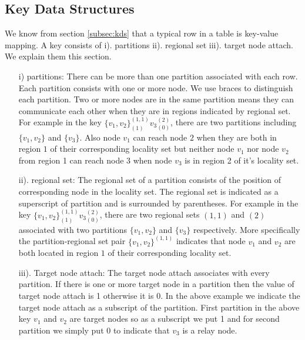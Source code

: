 \documentclass[12pt]{article}
\begin{document}
\subsection{Key Data Structures}
We know from section \ref{subsec:kds} that a typical row in a table is key-value mapping. A key consists of 
i). partitions ii). regional set iii). target node attach. We explain them this section.


\begin{itemize}
\item[i)] partitions: There can be more than one partition associated with each row. Each partition consists with one or more node. We use braces to distinguish each partition. Two or more nodes are in the same partition means they can communicate each other when they are in regions indicated by regional set. For example in the key $\{v_1,v_2\}^{(1,1)}_{(1)}{v_3}^{(2)}_{(0)}$, there are two partitions including $\{v_1,v_2\}$ and $\{v_3\}$. Also node $v_1$ can reach node $2$ when they are both in region $1$ of their corresponding locality set but neither node $v_1$ nor node $v_2$  from region 1 can reach node 3 when node $v_3$ is in region 2 of it's locality set.
\item[ii).] regional set: The regional set of a partition consists of the position of corresponding node in the locality set. The regional set is indicated as a superscript of partition and is surrounded by parentheses. For example in the key $\{v_1,v_2\}^{(1,1)}_{(1)}{v_3}^{(2)}_{(0)}$, there are two regional sets $(1,1)$ and $(2)$ associated with two partitions $\{v_1,v_2\}$ and $\{v_3\}$ respectively. More specifically the partition-regional set pair $\{v_1,v_2\}^{(1,1)}$ indicates that node $v_1$ and $v_2$ are both located in region $1$ of their corresponding locality set.
\item[iii).] Target node attach: The target node attach associates with every partition. If there is one or more target node in a partition then the value of target node attach is 1 otherwise it is 0. In the above example we indicate the target node attach as a subscript of the partition. First partition in the above key $v_1$ and $v_2$ are target nodes so as a subscript we put 1 and for second partition we simply put 0 to indicate that $v_3$ is a relay node.
\end{itemize}
\end{document}
